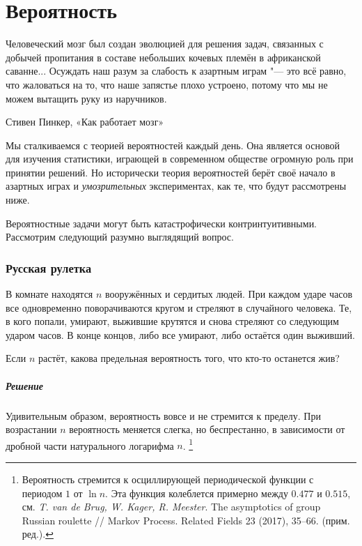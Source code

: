 \documentclass[twoside]{book}
\makeatletter
\newcommand{\rindex}[2][\imki@jobname]{%
  \index[#1]{\detokenize{#2}}%
}
\makeatother
\begin{document}

\chapter{Вероятность}

\setlength{\epigraphwidth}{.8\textwidth}
\epigraph{Человеческий мозг был создан эволюцией для решения задач, связанных с добычей пропитания в составе небольших кочевых племён в африканской саванне...
  Осуждать наш разум за слабость к азартным играм "--- это всё равно, что жаловаться на то, что наше запястье плохо устроено, потому что мы не можем вытащить руку из наручников.%
}{Стивен Пинкер, «Как работает мозг»%
}

Мы сталкиваемся с теорией вероятностей каждый день.
Она является основой для изучения статистики, играющей в современном обществе огромную роль при принятии решений.
Но исторически теория вероятностей берёт своё начало в азартных играх и \emph{умозрительных} экспериментах, как те, что будут рассмотрены ниже.


Вероятностные задачи могут быть катастрофически контринтуитивными.
Рассмотрим следующий разумно выглядящий вопрос.

\subsection*{Русская рулетка} %
\rindex{Русская рулетка}

В комнате находятся $n$ вооружённых и сердитых людей.
При каждом ударе часов все одновременно поворачиваются кругом и стреляют в случайного человека.
Те, в кого попали, умирают, выжившие крутятся и снова стреляют со следующим ударом часов.
В конце концов, либо все умирают, либо остаётся один выживший.

Если $n$ растёт, какова предельная вероятность того, что кто-то останется жив?

\paragraph{Решение} Удивительным образом, вероятность вовсе и не стремится к пределу.
При возрастании $n$ вероятность меняется слегка, но беспрестанно, в зависимости от дробной части натурального логарифма $n$.%
\footnote{Вероятность стремится к осциллирующей периодической функции с периодом $1$ от $\ln n$.
Эта функция колеблется примерно между $0.477$ и $0.515$, см.
\emph{T. van de Brug, W. Kager, R. Meester}. The asymptotics of group Russian roulette /\!/ {Markov Process. Related Fields} 23 (2017), 35--66.
(прим. ред.).}
\end{document}
